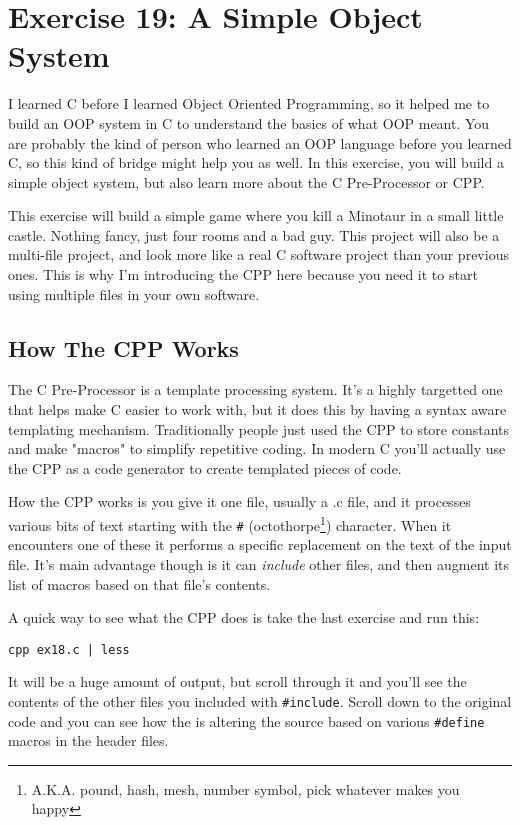 \chapter{Exercise 19: A Simple Object System}

I learned C before I learned Object Oriented Programming, so it helped me to
build an OOP system in C to understand the basics of what OOP meant.  You are
probably the kind of person who learned an OOP language before you learned C,
so this kind of bridge might help you as well.  In this exercise, you will
build a simple object system, but also learn more about the C Pre-Processor or
CPP.

This exercise will build a simple game where you kill a Minotaur in a small
little castle.  Nothing fancy, just four rooms and a bad guy.  This project
will also be a multi-file project, and look more like a real C software 
project than your previous ones.  This is why I'm introducing the CPP here
because you need it to start using multiple files in your own software.

\section{How The CPP Works}

The C Pre-Processor is a template processing system.  It's a highly
targetted one that helps make C easier to work with, but it does
this by having a syntax aware templating mechanism.  Traditionally
people just used the CPP to store constants and make "macros" to simplify
repetitive coding.  In modern C you'll actually use the CPP as a code
generator to create templated pieces of code.

How the CPP works is you give it one file, usually a .c file, and it
processes various bits of text starting with the \verb|#| (octothorpe\footnote{A.K.A. pound, hash, mesh, number symbol, pick whatever makes you happy})
character.  When it encounters one of these it performs a specific replacement
on the text of the input file.  It's main advantage though is it can
\emph{include} other files, and then augment its list of macros
based on that file's contents.

A quick way to see what the CPP does is take the last exercise and 
run this:

\begin{lstlisting}
cpp ex18.c | less
\end{lstlisting}

It will be a huge amount of output, but scroll through it and you'll see the
contents of the other files you included with \verb|#include|.  Scroll down
to the original code and you can see how the  is altering the
source based on various \verb|#define| macros in the header files.

